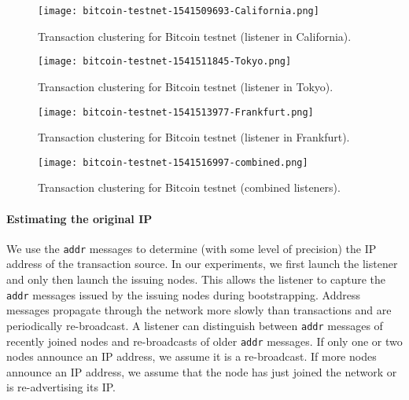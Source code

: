 \begin{figure*}
	\centering
	\begin{minipage}{0.5\textwidth}
		\centering
		\texttt{[image: bitcoin-testnet-1541509693-California.png]}
		\caption{Transaction clustering for Bitcoin testnet (listener in California).}
		\label{fig:bitcoin-testnet-california}
	\end{minipage}\hfill
	\begin{minipage}{0.5\textwidth}
		\centering
		\texttt{[image: bitcoin-testnet-1541511845-Tokyo.png]}
		\caption{Transaction clustering for Bitcoin testnet (listener in Tokyo).}
		\label{fig:bitcoin-testnet-tokyo}
	\end{minipage}\hfill
\end{figure*}

\begin{figure*}
	\centering
	\begin{minipage}{0.5\textwidth}
		\centering
		\texttt{[image: bitcoin-testnet-1541513977-Frankfurt.png]}
		\caption{Transaction clustering for Bitcoin testnet (listener in Frankfurt).}
		\label{fig:bitcoin-testnet-frankfurt}
	\end{minipage}\hfill
	\begin{minipage}{0.5\textwidth}
		\centering
		\texttt{[image: bitcoin-testnet-1541516997-combined.png]}
		\caption{Transaction clustering for Bitcoin testnet (combined listeners).}
		\label{fig:bitcoin-testnet-combined}
	\end{minipage}\hfill
\end{figure*}


\paragraph{Estimating the original IP}

We use the \texttt{addr} messages to determine (with some level of precision) the IP address of the transaction source.
In our experiments, we first launch the listener and only then launch the issuing nodes.
This allows the listener to capture the \texttt{addr} messages issued by the issuing nodes during bootstrapping.
Address messages propagate through the network more slowly than transactions and are periodically re-broadcast.
A listener can distinguish between \texttt{addr} messages of recently joined nodes and re-broadcasts of older \texttt{addr} messages.
If only one or two nodes announce an IP address, we assume it is a re-broadcast.
If more nodes announce an IP address, we assume that the node has just joined the network or is re-advertising its IP.

